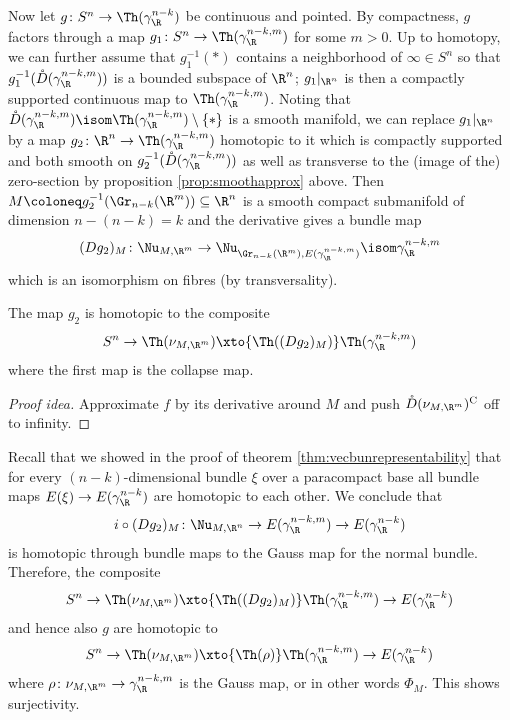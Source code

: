 Now let $g\colon S^n \to \Th(\gamma_\R^{n - k})$ be continuous and pointed.
By compactness, $g$ factors through a map $g_1\colon S^n \to \Th(\gamma_\R^{n - k, m})$ for some $m > 0$.
Up to homotopy, we can further assume that $g_1^{-1}(*)$ contains a neighborhood of $\infty \in S^n$ so that $g_1^{-1}(\mathring{D}(\gamma_\R^{n - k, m}))$ is a bounded subspace of $\R^n$; $g_1|_{\R^n}$ is then a compactly supported continuous map to $\Th(\gamma_\R^{n - k, m})$.
Noting that $\mathring{D}(\gamma_\R^{n - k, m}) \isom \Th(\gamma_\R^{n - k, m}) \setminus \{*\}$ is a smooth manifold, we can replace $g_1|_{\R^n}$ by a map $g_2\colon \R^n \to \Th(\gamma_\R^{n - k, m})$ homotopic to it which is compactly supported and both smooth on $g_2^{-1}(\mathring{D}(\gamma_\R^{n - k, m}))$ as well as transverse to the (image of the) zero-section by proposition \ref{prop:smoothapprox} above.
Then $M \coloneq g_2^{-1}(\Gr_{n - k}(\R^m)) \subseteq \R^n$ is a smooth compact submanifold of dimension $n - (n - k) = k$ and the derivative gives a bundle map 
\begin{equation*}
	(D g_2)_M\colon \Nu_{M, \R^m} \to \Nu_{\Gr_{n - k}(\R^m), E(\gamma_\R^{n - k, m})} \isom \gamma_\R^{n - k, m}
\end{equation*}
which is an isomorphism on fibres (by transversality).
\begin{lemma}
	The map $g_2$ is homotopic to the composite
	\begin{equation*}
		S^n \to \Th(\nu_{M, \R^m}) \xto{\Th((D g_2)_M)} \Th(\gamma_\R^{n - k, m})
	\end{equation*}
	where the first map is the collapse map.
\end{lemma}
\begin{proof}[Proof idea]
	Approximate $f$ by its derivative around $M$ and push $\mathring{D}(\nu_{M, \R^m})^{\mathrm{C}}$ off to infinity.
\end{proof}

Recall that we showed in the proof of theorem \ref{thm:vecbunrepresentability} that for every $(n - k)$-dimensional bundle $\xi$ over a paracompact base all bundle maps $E(\xi) \to E(\gamma_\R^{n - k})$ are homotopic to each other.
We conclude that
\begin{equation*}
	i \circ (D g_2)_M\colon \Nu_{M, \R^n} \to E(\gamma_\R^{n - k, m}) \to E(\gamma_\R^{n - k})
\end{equation*}
is homotopic through bundle maps to the Gauss map for the normal bundle.
Therefore, the composite
\begin{equation*}
	S^n \to \Th(\nu_{M, \R^m}) \xto{\Th((D g_2)_M)} \Th(\gamma_\R^{n - k, m}) \to E(\gamma_\R^{n - k})
\end{equation*}
and hence also $g$ are homotopic to
\begin{equation*}
	S^n \to \Th(\nu_{M, \R^m}) \xto{\Th(\rho)} \Th(\gamma_\R^{n - k, m}) \to E(\gamma_\R^{n - k})
\end{equation*}
where $\rho\colon \nu_{M, \R^m} \to \gamma_\R^{n - k, m}$ is the Gauss map, or in other words $\Phi_M$.
This shows surjectivity.

